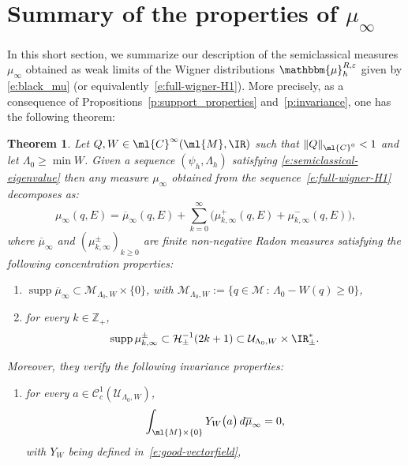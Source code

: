 \documentclass[JEP,XML,SOM,Unicode, NoEqCountersInSection,published]{cedram}
\let\bm\mathbbm
\theoremstyle{plain}
\newtheorem{theo}{Theorem}[section]
\theoremstyle{definition}
\theoremstyle{remark}
\begin{document}
\section{Summary of the properties of \texorpdfstring{$\mu_\infty$}{mu}}
\label{s:main_results_and_proofs}

In this short section, we summarize our description of the semiclassical measures~$\mu_\infty$ obtained as weak limits of the Wigner distributions $\bm{\mu}_{h}^{R,\varepsilon}$ given by \eqref{e:black_mu} (or equivalently~\eqref{e:full-wigner-H1}). More precisely, as a consequence of Propositions~\ref{p:support_properties} and~\ref{p:invariance}, one has the following theorem:

\begin{theo}\label{t:maintheo} Let $Q,W\in\ml{C}^\infty(\ml{M},\IR)$ such that $\|Q\|_{\ml{C}^0}<1$ and let $\Lambda_0\geq\min W$. Given a sequence $(\psi_h,\Lambda_h)$ satisfying \eqref{e:semiclassical-eigenvalue} then any measure $\mu_\infty$ obtained from the sequence~\eqref{e:full-wigner-H1} decomposes as:
\begin{equation}
\mu_\infty(q,E) = \overline{\mu}_\infty(q,E) + \sum_{k=0}^\infty \big(\mu^+_{k,\infty}(q,E) + \mu^-_{k,\infty}(q,E) \big),
\end{equation}
where $\overline{\mu}_\infty$ and $(\mu^\pm_{k,\infty})_{k\geq 0}$ are finite non-negative Radon measures satisfying the following concentration properties:
\begin{enumerate}\renewcommand{\theenumi}{S.\arabic{enumi}}

\item
\label{i:support_1} $\operatorname{supp} \overline{\mu}_{\infty} \subset \mathcal{M}_{\Lambda_0,W} \times \{ 0 \}$,
with $\mathcal{M}_{\Lambda_0,W} := \{ q \in \mathcal{M} \, : \, \Lambda_0 - W(q) \geq 0 \}$,

\item
\label{i:support_2} for every $k \in \mathbb{Z}_+$,
\[
\operatorname{supp} \mu^\pm_{k,\infty} \subset \mathcal{H}_\pm^{-1}(2k+1) \subset\mathcal{U}_{\Lambda_0,W}\times\IR_{\pm}^*.
\]
\end{enumerate}
Moreover, they verify the following invariance properties:

\begin{enumerate}\renewcommand{\theenumi}{P.\arabic{enumi}}

\item
\label{i:invariance_1} for every $a \in \mathcal{C}^1_c(\mathcal{U}_{\Lambda_0,W})$,
\[
\int_{\ml{M}\times\{0\}} Y_W \big(a \big) \, d\overline{ \mu}_\infty = 0,
\]
with $Y_W$ being defined in~\eqref{e:good-vectorfield},


\end{enumerate}
\end{theo}
\end{document}
